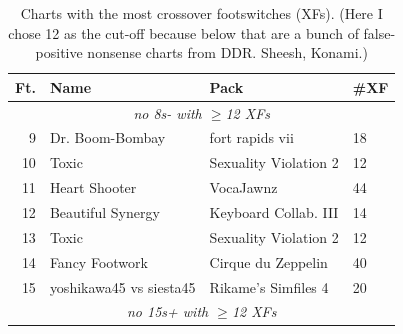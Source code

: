\documentclass[10pt]{sigplanconf}
\begin{document}
\begin{table}[t]
	\begin{center}
		\small
	\begin{tabular}{r|l|l|l}
		\bf Ft. & \bf Name & \bf Pack & \bf \#XF \\
		\hline
		\multicolumn{4}{c}{\em no 8s- with $\ge$12 XFs} \\
		 9 & Dr. Boom-Bombay   & fort rapids vii            & 18 \\
		10 & Toxic             & Sexuality Violation 2      & 12 \\
		11 & Heart Shooter     & VocaJawnz                  & 44 \\
		12 & Beautiful Synergy & Keyboard Collab. III & 14 \\
		13 & Toxic             & Sexuality Violation 2      & 12 \\
		14 & Fancy Footwork    & Cirque du Zeppelin         & 40 \\
		15 & yoshikawa45 vs siesta45 & Rikame's Simfiles 4  & 20 \\
		\multicolumn{4}{c}{\em no 15s+ with $\ge$12 XFs} \\
	\end{tabular}
	\end{center}
	\caption{Charts with the most crossover footswitches (XFs). (Here I chose 12 as the cut-off because below that are a bunch of false-positive nonsense charts from DDR. Sheesh, Konami.)}
\end{table}
\end{document}
